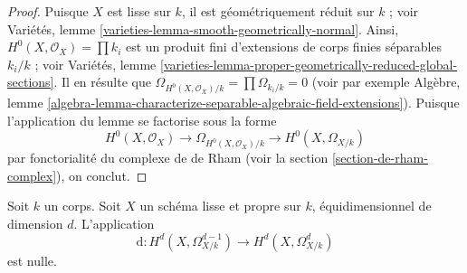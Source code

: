 \begin{proof}
Puisque $X$ est lisse sur $k$, il est géométriquement réduit sur $k$ ; voir
Variétés, lemme \ref{varieties-lemma-smooth-geometrically-normal}.
Ainsi, $H^0(X, \mathcal{O}_X) = \prod k_i$
est un produit fini d'extensions de corps finies
séparables $k_i/k$ ; voir Variétés, lemme
\ref{varieties-lemma-proper-geometrically-reduced-global-sections}.
Il en résulte que $\Omega_{H^0(X, \mathcal{O}_X)/k} = \prod \Omega_{k_i/k} = 0$
(voir par exemple Algèbre, lemme
\ref{algebra-lemma-characterize-separable-algebraic-field-extensions}).
Puisque l'application du lemme se factorise sous la forme
$$
H^0(X, \mathcal{O}_X) \to
\Omega_{H^0(X, \mathcal{O}_X)/k} \to
H^0(X, \Omega_{X/k})
$$
par fonctorialité du complexe de de Rham
(voir la section \ref{section-de-rham-complex}), on conclut.
\end{proof}

\begin{lemma}
\label{lemma-top-part-degenerates}
Soit $k$ un corps. Soit $X$ un schéma lisse et propre sur $k$,
équidimensionnel de dimension $d$. L'application
$$
\text{d} : H^d(X, \Omega^{d - 1}_{X/k}) \to H^d(X, \Omega^d_{X/k})
$$
est nulle.
\end{lemma}


